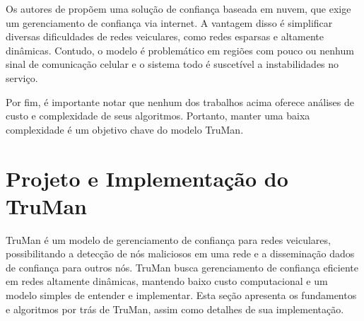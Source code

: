 \begin{resumoextendido}
	Os autores de \citep{chen2017cloud} propõem uma solução de confiança baseada em nuvem, que exige um gerenciamento de confiança via internet.
	A vantagem disso é simplificar diversas dificuldades de redes veiculares, como redes esparsas e altamente dinâmicas.
	Contudo, o modelo é problemático em regiões com pouco ou nenhum sinal de comunicação celular e o sistema todo é suscetível a instabilidades no serviço.
	
	Por fim, é importante notar que nenhum dos trabalhos acima oferece análises de custo e complexidade de seus algoritmos.
	Portanto, manter uma baixa complexidade é um objetivo chave do modelo TruMan.
	
	\section*{Projeto e Implementação do TruMan}
	
	TruMan é um modelo de gerenciamento de confiança para redes veiculares, possibilitando a detecção de nós maliciosos em uma rede e a disseminação dados de confiança para outros nós.
	TruMan busca gerenciamento de confiança eficiente em redes altamente dinâmicas, mantendo baixo custo computacional e um modelo simples de entender e implementar.
	Esta seção apresenta os fundamentos e algoritmos por trás de TruMan, assim como detalhes de sua implementação.
	

\end{resumoextendido}
